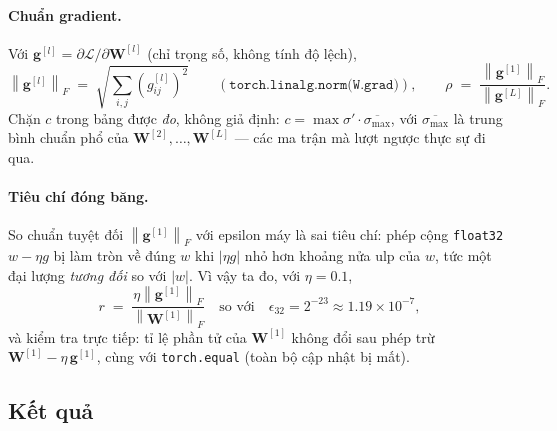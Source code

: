 \paragraph{Chuẩn gradient.} Với $\mathbf{g}^{[l]} = \partial\mathcal{L}/\partial\mathbf{W}^{[l]}$
(chỉ trọng số, không tính độ lệch),
\[
  \left\|\mathbf{g}^{[l]}\right\|_F \;=\; \sqrt{\textstyle\sum_{i,j}\left(g^{[l]}_{ij}\right)^{2}}
  \qquad(\texttt{torch.linalg.norm(W.grad)}),
  \qquad
  \rho \;=\; \frac{\left\|\mathbf{g}^{[1]}\right\|_F}{\left\|\mathbf{g}^{[L]}\right\|_F}.
\]
Chặn $c$ trong bảng được \emph{đo}, không giả định:
$c = \max\sigma'\cdot\overline{\sigma_{\max}}$, với $\overline{\sigma_{\max}}$ là
trung bình chuẩn phổ của $\mathbf{W}^{[2]},\dots,\mathbf{W}^{[L]}$ --- các ma trận
mà lượt ngược thực sự đi qua.

\paragraph{Tiêu chí đóng băng.} So chuẩn tuyệt đối $\left\|\mathbf{g}^{[1]}\right\|_F$
với epsilon máy là sai tiêu chí: phép cộng \texttt{float32} $w - \eta g$ bị làm
tròn về đúng $w$ khi $\left|\eta g\right|$ nhỏ hơn khoảng nửa ulp của $w$, tức
một đại lượng \emph{tương đối} so với $|w|$. Vì vậy ta đo, với $\eta = 0.1$,
\[
  r \;=\; \frac{\eta\left\|\mathbf{g}^{[1]}\right\|_F}{\left\|\mathbf{W}^{[1]}\right\|_F}
  \quad\text{so với}\quad
  \epsilon_{32} = 2^{-23} \approx 1.19\times10^{-7},
\]
và kiểm tra trực tiếp: tỉ lệ phần tử của $\mathbf{W}^{[1]}$ không đổi sau phép
trừ $\mathbf{W}^{[1]} - \eta\,\mathbf{g}^{[1]}$, cùng với
\texttt{torch.equal} (toàn bộ cập nhật bị mất).


\subsection{Kết quả}

